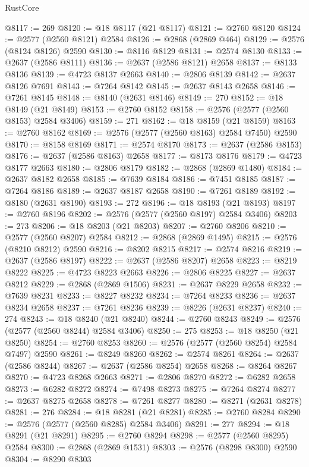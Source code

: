 \begin{lexlean}{RustCore}
\begin{coremodule}
@8117 := 269
@8120 := @18 @8117 (@21 @8117)
@8121 := @2760 @8120
@8124 := @2577 (@2560 @8121) @2584
@8126 := @2868 (@2869 @464)
@8129 := @2576 (@8124 @8126) @2590
@8130 := @8116 @8129
@8131 := @2574 @8130
@8133 := @2637 (@2586 @8111)
@8136 := @2637 (@2586 @8121) @2658
@8137 := @8133 @8136
@8139 := @4723 @8137 @2663
@8140 := @2806 @8139
@8142 := @2637 @8126 @7691
@8143 := @7264 @8142
@8145 := @2637 @8143 @2658
@8146 := @7261 @8145
@8148 := @8140 (@2631 @8146)
@8149 := 270
@8152 := @18 @8149 (@21 @8149)
@8153 := @2760 @8152
@8158 := @2576 (@2577 (@2560 @8153) @2584 @3406)
@8159 := 271
@8162 := @18 @8159 (@21 @8159)
@8163 := @2760 @8162
@8169 := @2576 (@2577 (@2560 @8163) @2584 @7450) @2590
@8170 := @8158 @8169
@8171 := @2574 @8170
@8173 := @2637 (@2586 @8153)
@8176 := @2637 (@2586 @8163) @2658
@8177 := @8173 @8176
@8179 := @4723 @8177 @2663
@8180 := @2806 @8179
@8182 := @2868 (@2869 @1480)
@8184 := @2637 @8182 @2658
@8185 := @7639 @8184
@8186 := @7451 @8185
@8187 := @7264 @8186
@8189 := @2637 @8187 @2658
@8190 := @7261 @8189
@8192 := @8180 (@2631 @8190)
@8193 := 272
@8196 := @18 @8193 (@21 @8193)
@8197 := @2760 @8196
@8202 := @2576 (@2577 (@2560 @8197) @2584 @3406)
@8203 := 273
@8206 := @18 @8203 (@21 @8203)
@8207 := @2760 @8206
@8210 := @2577 (@2560 @8207) @2584
@8212 := @2868 (@2869 @1495)
@8215 := @2576 (@8210 @8212) @2590
@8216 := @8202 @8215
@8217 := @2574 @8216
@8219 := @2637 (@2586 @8197)
@8222 := @2637 (@2586 @8207) @2658
@8223 := @8219 @8222
@8225 := @4723 @8223 @2663
@8226 := @2806 @8225
@8227 := @2637 @8212
@8229 := @2868 (@2869 @1506)
@8231 := @2637 @8229 @2658
@8232 := @7639 @8231
@8233 := @8227 @8232
@8234 := @7264 @8233
@8236 := @2637 @8234 @2658
@8237 := @7261 @8236
@8239 := @8226 (@2631 @8237)
@8240 := 274
@8243 := @18 @8240 (@21 @8240)
@8244 := @2760 @8243
@8249 := @2576 (@2577 (@2560 @8244) @2584 @3406)
@8250 := 275
@8253 := @18 @8250 (@21 @8250)
@8254 := @2760 @8253
@8260 := @2576 (@2577 (@2560 @8254) @2584 @7497) @2590
@8261 := @8249 @8260
@8262 := @2574 @8261
@8264 := @2637 (@2586 @8244)
@8267 := @2637 (@2586 @8254) @2658
@8268 := @8264 @8267
@8270 := @4723 @8268 @2663
@8271 := @2806 @8270
@8272 := @6282 @2658
@8273 := @6282 @8272
@8274 := @7498 @8273
@8275 := @7264 @8274
@8277 := @2637 @8275 @2658
@8278 := @7261 @8277
@8280 := @8271 (@2631 @8278)
@8281 := 276
@8284 := @18 @8281 (@21 @8281)
@8285 := @2760 @8284
@8290 := @2576 (@2577 (@2560 @8285) @2584 @3406)
@8291 := 277
@8294 := @18 @8291 (@21 @8291)
@8295 := @2760 @8294
@8298 := @2577 (@2560 @8295) @2584
@8300 := @2868 (@2869 @1531)
@8303 := @2576 (@8298 @8300) @2590
@8304 := @8290 @8303

\end{coremodule}
\end{lexlean}
